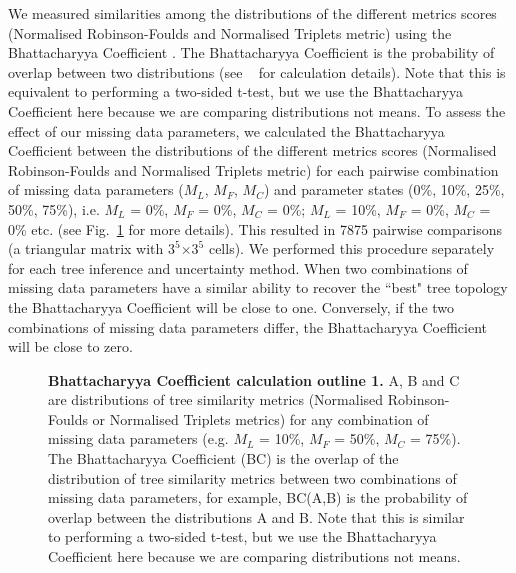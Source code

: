 \documentclass[10pt,letterpaper]{article}
\begin{document}
We measured similarities among the distributions of the different metrics scores (Normalised Robinson-Foulds and Normalised Triplets metric) using the Bhattacharyya Coefficient \cite{Bhattacharyya}. The Bhattacharyya Coefficient is the probability of overlap between two distributions \cite{Bhattacharyya} (see ~ for calculation details). Note that this is equivalent to performing a two-sided t-test, but we use the Bhattacharyya Coefficient here because we are comparing distributions not means. To assess the effect of our missing data parameters, we calculated the Bhattacharyya Coefficient between the distributions of the different metrics scores (Normalised Robinson-Foulds and Normalised Triplets metric) for each pairwise combination of missing data parameters ($M_{L}$, $M_{F}$, $M_{C}$) and parameter states (0\%, 10\%, 25\%, 50\%, 75\%), i.e. $M_{L}$ = 0\%, $M_{F}$ = 0\%, $M_{C}$ = 0\%; $M_{L}$ = 10\%, $M_{F}$ = 0\%, $M_{C}$ = 0\% etc. (see Fig.~\ref{Fig_Bhattacharyya_Coefficients1} for more details). This resulted in 7875 pairwise comparisons (a triangular matrix with $3^5$$\times$$3^5$ cells). We performed this procedure separately for each tree inference and uncertainty method. When two combinations of missing data parameters have a similar ability to recover the ``best" tree topology the Bhattacharyya Coefficient will be close to one. Conversely, if the two combinations of missing data parameters differ, the Bhattacharyya Coefficient will be close to zero.

\begin{figure}[h]
\caption{{\bf Bhattacharyya Coefficient calculation outline 1.}
 A, B and C are distributions of tree similarity metrics (Normalised Robinson-Foulds or Normalised Triplets metrics) for any combination of missing data parameters (e.g. $M_{L}$ = 10\%, $M_{F}$ = 50\%, $M_{C}$ = 75\%). The Bhattacharyya Coefficient (BC) is the overlap of the distribution of tree similarity metrics between two combinations of missing data parameters, for example, BC(A,B) is the probability of overlap between the distributions A and B. Note that this is similar to performing a two-sided t-test, but we use the Bhattacharyya Coefficient here because we are comparing distributions not means.}
\label{Fig_Bhattacharyya_Coefficients1}
\end{figure}
\end{document}
